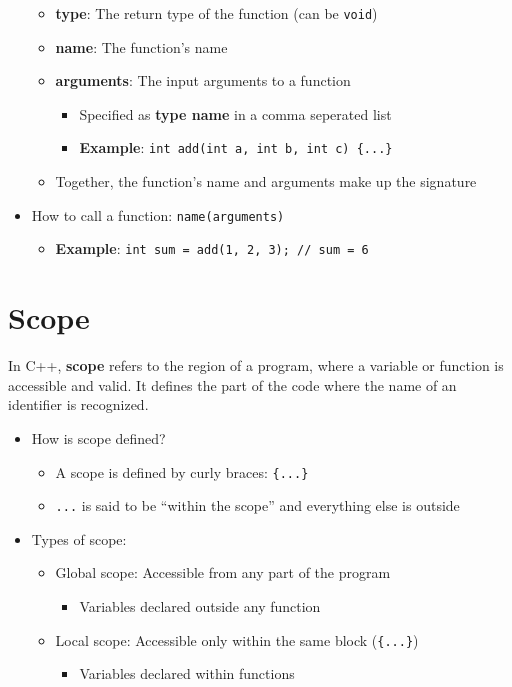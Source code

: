 \documentclass{article}
\begin{document}
\begin{itemize}
	\begin{itemize}
		\item \textbf{type}: The return type of the function (can be \texttt{void})
		\item \textbf{name}: The function's name
		\item \textbf{arguments}: The input arguments to a function
		\begin{itemize}
			\item Specified as \textbf{type name} in a comma seperated list
			\item \textbf{Example}: \texttt{int add(int a, int b, int c) \{...\}}
		\end{itemize}
		\item Together, the function's name and arguments make up the signature
	\end{itemize}
	\item How to call a function: \texttt{name(arguments)}
	\begin{itemize}
	\item \textbf{Example}: \texttt{int sum = add(1, 2, 3); // sum = 6}
	\end{itemize}
\end{itemize}

\section{Scope}

\noindent
In C++, \textbf{scope} refers to the region of a program, where a variable or function is accessible and valid. It defines the part of the code where the name of an identifier is recognized.

\begin{itemize}
	\item How is scope defined?
	\begin{itemize}
		\item A scope is defined by curly braces: \texttt{\{...\}}
		\item \texttt{...} is said to be ``within the scope'' and everything else is outside
	\end{itemize}
	\item Types of scope:
	\begin{itemize}
		\item Global scope: Accessible from any part of the program
		\begin{itemize}
			\item Variables declared outside any function
		\end{itemize}
		\item Local scope: Accessible only within the same block (\texttt{\{...\}})
		\begin{itemize}
			\item Variables declared within functions
		\end{itemize}
	\end{itemize}
\end{itemize}
\end{document}
